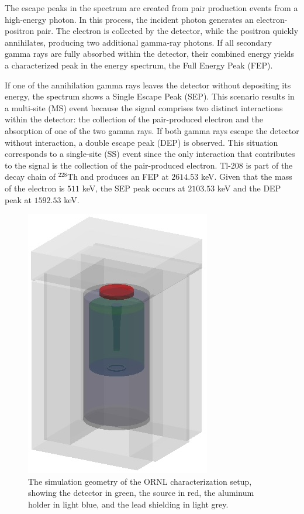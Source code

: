 The escape peaks in the spectrum are created from pair production events from a high-energy photon. In this process, the incident photon generates an electron-positron pair. The electron is collected by the detector, while the positron quickly annihilates, producing two additional gamma-ray photons. If all secondary gamma rays are fully absorbed within the detector, their combined energy yields a characterized peak in the energy spectrum, the Full Energy Peak (FEP).

If one of the annihilation gamma rays leaves the detector without depositing its energy, the spectrum shows a Single Escape Peak (SEP). This scenario results in a multi-site (MS) event because the signal comprises two distinct interactions within the detector: the collection of the pair-produced electron and the absorption of one of the two gamma rays. If both gamma rays escape the detector without interaction, a double escape peak (DEP) is observed. This situation corresponds to a single-site (SS) event since the only interaction that contributes to the signal is the collection of the pair-produced electron. Tl-208 is part of the decay chain of $^{228}$Th and produces an FEP at $2614.53$ keV. Given that the mass of the electron is $511$ keV, the SEP peak occurs at $2103.53$ keV and the DEP peak at $1592.53$ keV. 


\begin{figure}%
    \centering
    \includegraphics[width=0.4\linewidth]{ch7/figs/shielding.jpeg}
    \caption{The simulation geometry of the ORNL characterization setup, showing the detector in green, the source in red, the aluminum holder in light blue, and the lead shielding in light grey.}
   \label{ch7_fig_g4simple_setup}
\end{figure}


